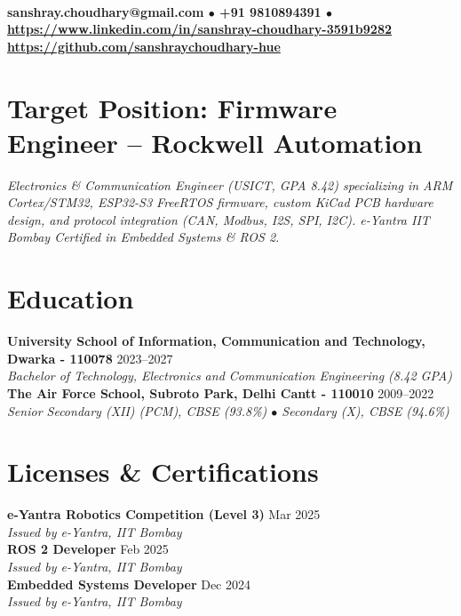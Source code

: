 \documentclass[10pt,a4paper]{article}%
\begin{document}
%
\normalsize%
 \vspace{3pt}\\%
\noindent \textbf{\scriptsize sanshray.choudhary@gmail.com $\bullet$ +91 9810894391 $\bullet$ \href{https://www.linkedin.com/in/sanshray-choudhary-3591b9282}{https://www.linkedin.com/in/sanshray-choudhary-3591b9282} \\ \href{https://github.com/sanshraychoudhary-hue}{https://github.com/sanshraychoudhary-hue}} \vspace{6pt}%

\section*{Target Position: Firmware Engineer -- Rockwell Automation}%
\noindent \textit{Electronics \& Communication Engineer (USICT, GPA 8.42) specializing in ARM Cortex/STM32, ESP32-S3 FreeRTOS firmware, custom KiCad PCB hardware design, and protocol integration (CAN, Modbus, I2S, SPI, I2C). e-Yantra IIT Bombay Certified in Embedded Systems \& ROS 2.} \vspace{6pt}%

\section*{Education}%
\noindent \textbf{University School of Information, Communication and Technology, Dwarka - 110078} \hfill 2023--2027 \\%
\indent \textit{Bachelor of Technology, Electronics and Communication Engineering (8.42 GPA)} \vspace{6pt}\\%
\noindent \textbf{The Air Force School, Subroto Park, Delhi Cantt - 110010} \hfill 2009--2022 \\%
\indent \textit{Senior Secondary (XII) (PCM), CBSE (93.8\%) $\bullet$ Secondary (X), CBSE (94.6\%)} \vspace{6pt}%

\section*{Licenses \& Certifications}%
\noindent \textbf{e-Yantra Robotics Competition (Level 3)} \hfill Mar 2025 \\%
\indent \textit{Issued by e-Yantra, IIT Bombay} \vspace{4pt}\\%
\noindent \textbf{ROS 2 Developer} \hfill Feb 2025 \\%
\indent \textit{Issued by e-Yantra, IIT Bombay} \vspace{4pt}\\%
\noindent \textbf{Embedded Systems Developer} \hfill Dec 2024 \\%
\indent \textit{Issued by e-Yantra, IIT Bombay} \vspace{6pt}%
\end{document}
